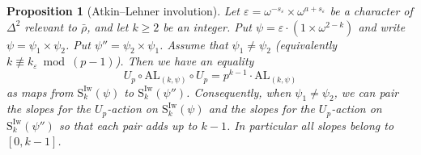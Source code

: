 \documentclass[12pt]{amsart}
\newtheorem{proposition}[subsection]{Proposition}
\theoremstyle{definition}
\numberwithin{equation}{subsection}
\def\rmS{\mathrm{S}}
\newcommand{\AL}{\mathrm{AL}}
\newcommand{\Iw}{\mathrm{Iw}}
\begin{document}
\begin{proposition}[Atkin--Lehner involution]
\label{P:Atkin-Lehner duality_part3}
Let $\varepsilon = \omega^{-s_\varepsilon} \times \omega^{a+s_\varepsilon}$ be a character of $\Delta^2$ relevant to $\bar \rho$, and let $k \geq 2$ be an integer. Put $\psi = \varepsilon\cdot (1\times \omega^{2-k})$ and write $\psi=\psi_1\times \psi_2$. Put $\psi'' = \psi_2 \times \psi_1$. Assume that $\psi_1 \neq \psi_2$ (equivalently $k \not\equiv k_\varepsilon \bmod{(p-1)}$). Then we have an equality
\begin{equation}
\label{E:Atkin-Lehner involution}
U_p \circ \AL_{(k, \psi)} \circ U_p = p^{k-1} \cdot \AL_{(k, \psi)}
\end{equation}
as maps from $\rmS_{k}^{\Iw}( \psi)$ to $\rmS_{k}^{\Iw}( \psi'')$.
Consequently, when $\psi_1 \neq \psi_2$,  we can pair the slopes for the $U_p$-action on $\rmS_{k}^{\Iw}( \psi)$ and the slopes for the $U_p$-action on $\rmS_{k}^{\Iw}( \psi'')$ so that each pair adds up to $k-1$. In particular all slopes belong to $[0, k-1]$.
\end{proposition}
\end{document}
